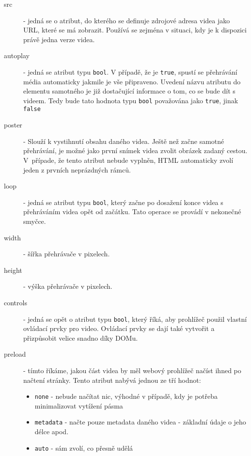 \begin{description}
	\item[src] - jedná se o atribut, do kterého se definuje zdrojové adresa videa jako URL, které se má zobrazit. Používá se zejména v situaci, kdy je k dispozici právě jedna verze videa.
	
	\item[autoplay] - jedná se atribut typu \texttt{bool}. V případě, že je \texttt{true}, spustí se přehrávání média automaticky jakmile je vše připraveno. Uvedení názvu atributu do elementu samotného je již dostačující informace o tom, co se bude dít s videem. Tedy bude tato hodnota typu \texttt{bool} považována jako \texttt{true}, jinak \texttt{false}	
	
	\item[poster]  - Slouží k vystihnutí obsahu daného videa. Ještě než začne samotné přehrávání, je možné jako první snímek videa zvolit obrázek zadaný cestou. V~případe, že tento atribut nebude vyplněn, HTML automaticky zvolí jeden z prvních neprázdných rámců.
	
	\item[loop]  - jedná se atribut typu \texttt{bool}, který začne po dosažení konce videa s přehráváním videa opět od začátku. Tato operace se provádí v nekonečné smyčce.

	\item[width] - šířka přehrávače v pixelech.
	
	\item[height] - výška přehrávače v pixelech.
	
	\item[controls] - jedná se opět o atribut typu \texttt{bool}, který říká, aby prohlížeč použil vlastní ovládací prvky pro video. Ovládací prvky se dají také vytvořit a přizpůsobit velice snadno díky DOMu.
 	
 	\item[preload]  - tímto říkáme, jakou část videa by měl webový prohlížeč načíst ihned po načtení stránky. Tento atribut nabývá jednou ze tří hodnot:
	 	\begin{itemize}
	 		\item \texttt{none} - nebude načítat nic, výhodné v případě, kdy je potřeba minimalizovat vytížení pásma	 		
	 		\item \texttt{metadata} - načte pouze metadata daného videa - základní údaje o jeho délce apod.
	 		\item \texttt{auto} - sám zvolí, co přesně udělá 
	 	\end{itemize}
\end{description}


